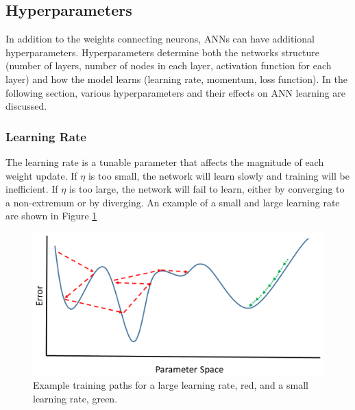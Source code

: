 



\subsection{Hyperparameters}

In addition to the weights connecting neurons, ANNs can have additional hyperparameters. Hyperparameters determine both the networks structure (number of layers, number of nodes in each layer, activation function for each layer) and how the model learns (learning rate, momentum, loss function). In the following section, various hyperparameters and their effects on ANN learning are discussed.

\subsubsection{Learning Rate}

The learning rate is a tunable parameter that affects the magnitude of each weight update. If $\eta$ is too small, the network will learn slowly and training will be inefficient. If $\eta$ is too large, the network will fail to learn, either by converging to a non-extremum or by diverging. An example of a small and large learning rate are shown in Figure \ref{fig:Learning_rate_comparison} 

\begin{figure}[H]
	\centering
	\includegraphics[width=0.8\linewidth]{images/Learning_rate_comparison_v2}
	\caption{Example training paths for a large learning rate, red, and a small learning rate, green.}
	\label{fig:Learning_rate_comparison}
\end{figure}



